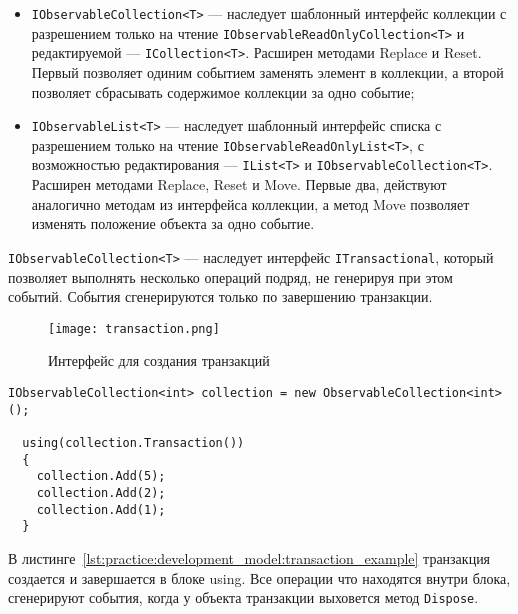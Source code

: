 \begin{itemize}
  \item \lstinline[style=csharpinlinestyle]!IObservableCollection<T>! --- наследует шаблонный интерфейс коллекции с разрешением только на чтение \lstinline[style=csharpinlinestyle]!IObservableReadOnlyCollection<T>! и редактируемой --- \lstinline[style=csharpinlinestyle]!ICollection<T>!.
  Расширен методами Replace и Reset. Первый позволяет одиним событием заменять элемент в коллекции, а второй позволяет сбрасывать содержимое коллекции за одно событие;
  \item \lstinline[style=csharpinlinestyle]!IObservableList<T>! --- наследует шаблонный интерфейс списка с разрешением только на чтение \lstinline[style=csharpinlinestyle]!IObservableReadOnlyList<T>!, с возможностью редактирования --- \lstinline[style=csharpinlinestyle]!IList<T>! и \lstinline[style=csharpinlinestyle]!IObservableCollection<T>!.
  Расширен методами Replace, Reset и Move. Первые два, действуют аналогично методам из интерфейса коллекции, а метод Move позволяет изменять положение объекта за одно событие.
\end{itemize}

\lstinline[style=csharpinlinestyle]!IObservableCollection<T>! --- наследует интерфейс \lstinline[style=csharpinlinestyle]!ITransactional!, который позволяет выполнять несколько операций подряд, не генерируя при этом событий.
События сгенерируются только по завершению транзакции.

\begin{figure}[ht]
\centering
  \texttt{[image: transaction.png]}
  \caption{ Интерфейс для создания транзакций }
  \label{fig:transaction}
\end{figure}

\begin{lstlisting}[style=csharpinlinestyle, caption={Использование транзакции}, label=lst:practice:development_model:transaction_example]
  IObservableCollection<int> collection = new ObservableCollection<int>();

  using(collection.Transaction())
  {
    collection.Add(5);
    collection.Add(2);
    collection.Add(1);
  }
\end{lstlisting}

В листинге~\ref{lst:practice:development_model:transaction_example} транзакция создается и завершается в блоке using.
Все операции что находятся внутри блока, сгенерируют события, когда у объекта транзакции выховется метод \lstinline[style=csharpinlinestyle]!Dispose!.

